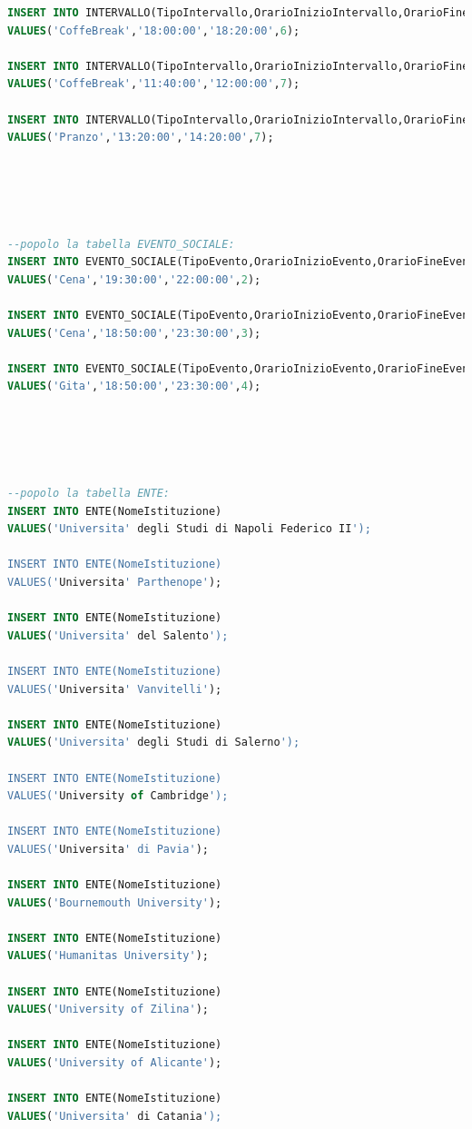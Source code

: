 \documentclass[a4page]{article}
\begin{document}
\begin{lstlisting}[language=SQL,
        deletekeywords={IDENTITY,INT},
        morekeywords={clustered},    
        framesep=10pt,
        framextopmargin=10pt]
INSERT INTO INTERVALLO(TipoIntervallo,OrarioInizioIntervallo,OrarioFineIntervallo,CodProgramma)
VALUES('CoffeBreak','18:00:00','18:20:00',6);

INSERT INTO INTERVALLO(TipoIntervallo,OrarioInizioIntervallo,OrarioFineIntervallo,CodProgramma)
VALUES('CoffeBreak','11:40:00','12:00:00',7);

INSERT INTO INTERVALLO(TipoIntervallo,OrarioInizioIntervallo,OrarioFineIntervallo,CodProgramma)
VALUES('Pranzo','13:20:00','14:20:00',7);





--popolo la tabella EVENTO_SOCIALE:
INSERT INTO EVENTO_SOCIALE(TipoEvento,OrarioInizioEvento,OrarioFineEvento,CodProgramma)
VALUES('Cena','19:30:00','22:00:00',2);

INSERT INTO EVENTO_SOCIALE(TipoEvento,OrarioInizioEvento,OrarioFineEvento,CodProgramma)
VALUES('Cena','18:50:00','23:30:00',3);

INSERT INTO EVENTO_SOCIALE(TipoEvento,OrarioInizioEvento,OrarioFineEvento,CodProgramma)
VALUES('Gita','18:50:00','23:30:00',4);





--popolo la tabella ENTE:
INSERT INTO ENTE(NomeIstituzione)
VALUES('Universita' degli Studi di Napoli Federico II');

INSERT INTO ENTE(NomeIstituzione)
VALUES('Universita' Parthenope');

INSERT INTO ENTE(NomeIstituzione)
VALUES('Universita' del Salento');

INSERT INTO ENTE(NomeIstituzione)
VALUES('Universita' Vanvitelli');

INSERT INTO ENTE(NomeIstituzione)
VALUES('Universita' degli Studi di Salerno');

INSERT INTO ENTE(NomeIstituzione)
VALUES('University of Cambridge');

INSERT INTO ENTE(NomeIstituzione)
VALUES('Universita' di Pavia');

INSERT INTO ENTE(NomeIstituzione)
VALUES('Bournemouth University');

INSERT INTO ENTE(NomeIstituzione)
VALUES('Humanitas University');

INSERT INTO ENTE(NomeIstituzione)
VALUES('University of Zilina');

INSERT INTO ENTE(NomeIstituzione)
VALUES('University of Alicante');

INSERT INTO ENTE(NomeIstituzione)
VALUES('Universita' di Catania');






\end{lstlisting}
\end{document}
